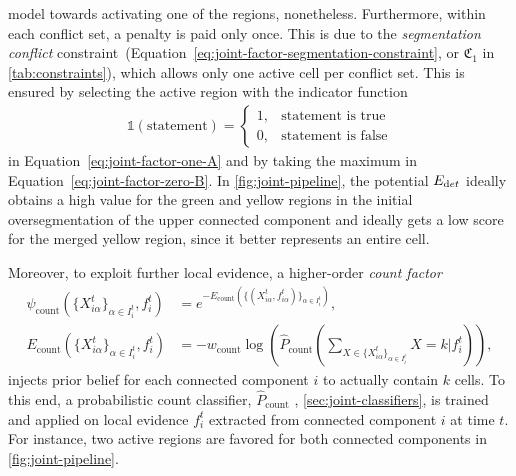 model towards activating one of the regions, nonetheless.  Furthermore, within each conflict set, a
penalty is paid only once. This is due to the \emph{segmentation conflict}
constraint~(Equation~\ref{eq:joint-factor-segmentation-constraint}, or $\mathfrak{C}_1$ in
\cref{tab:constraints}), which allows only one active cell per conflict set. This is ensured by
selecting the active region with the indicator function
\begin{align}
    \mathds{1}(\text{statement}) =
    \begin{cases}
        1, & \text{statement is true} \\
        0, & \text{statement is false}
    \end{cases} 
\end{align}
in Equation~\ref{eq:joint-factor-one-A} and by taking the maximum in
Equation~\ref{eq:joint-factor-zero-B}. In \cref{fig:joint-pipeline}, the potential $E_{\text det}$
ideally obtains a high value for the green and yellow regions in the initial oversegmentation of the
upper connected component and ideally gets a low score for the merged yellow region, since it
better represents an entire cell.

Moreover, to exploit further local evidence, a higher-order \emph{count factor}
\begin{align}
    \label{eq:psi-count}
    \psi_{\text{count}}(\{X_{i\alpha}^t\}_{\alpha \in
        I_i^t},f_{i}^t)&=e^{-E_{\text{count}}(\{(X_{i\alpha}^t,f_{i\alpha}^t)\}_{\alpha \in I_i^t})}, \\
    E_{\text{count}}(\{X_{i\alpha}^t\}_{\alpha \in I_i^t},f_{i}^t) &=
    -w_{\text{count}}\log\left(\hat{P}_{\text{count}}\left(\sum_{X \in \{X_{i\alpha}^t\}_{\alpha \in
                    I_i^t}}X=k|f_i^t\right)\right),
\end{align}
injects prior belief for each connected component $i$ to actually contain $k$ cells. To this end, a
probabilistic count classifier, $\hat{P}_{\text{count}}$ %
, \cf \cref{sec:joint-classifiers}, is trained and applied
on local evidence $f_i^t$ extracted from connected component $i$ at time $t$.
For instance, 
two active regions are favored for both connected components in \cref{fig:joint-pipeline}.

